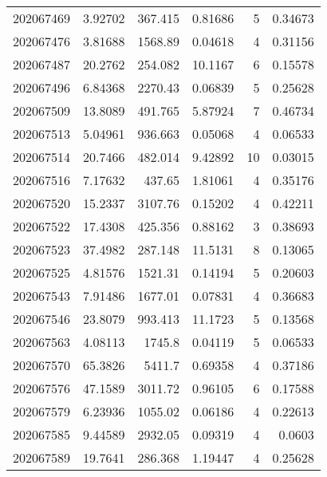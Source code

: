 \begin{tabular}{rrrrrr}
 202067469 &          3.92702 &      367.415  &            0.81686 &           5 & 0.34673 \\
 202067476 &          3.81688 &     1568.89   &            0.04618 &           4 & 0.31156 \\
 202067487 &         20.2762  &      254.082  &           10.1167  &           6 & 0.15578 \\
 202067496 &          6.84368 &     2270.43   &            0.06839 &           5 & 0.25628 \\
 202067509 &         13.8089  &      491.765  &            5.87924 &           7 & 0.46734 \\
 202067513 &          5.04961 &      936.663  &            0.05068 &           4 & 0.06533 \\
 202067514 &         20.7466  &      482.014  &            9.42892 &          10 & 0.03015 \\
 202067516 &          7.17632 &      437.65   &            1.81061 &           4 & 0.35176 \\
 202067520 &         15.2337  &     3107.76   &            0.15202 &           4 & 0.42211 \\
 202067522 &         17.4308  &      425.356  &            0.88162 &           3 & 0.38693 \\
 202067523 &         37.4982  &      287.148  &           11.5131  &           8 & 0.13065 \\
 202067525 &          4.81576 &     1521.31   &            0.14194 &           5 & 0.20603 \\
 202067543 &          7.91486 &     1677.01   &            0.07831 &           4 & 0.36683 \\
 202067546 &         23.8079  &      993.413  &           11.1723  &           5 & 0.13568 \\
 202067563 &          4.08113 &     1745.8    &            0.04119 &           5 & 0.06533 \\
 202067570 &         65.3826  &     5411.7    &            0.69358 &           4 & 0.37186 \\
 202067576 &         47.1589  &     3011.72   &            0.96105 &           6 & 0.17588 \\
 202067579 &          6.23936 &     1055.02   &            0.06186 &           4 & 0.22613 \\
 202067585 &          9.44589 &     2932.05   &            0.09319 &           4 & 0.0603  \\
 202067589 &         19.7641  &      286.368  &            1.19447 &           4 & 0.25628 \\

\end{tabular}
